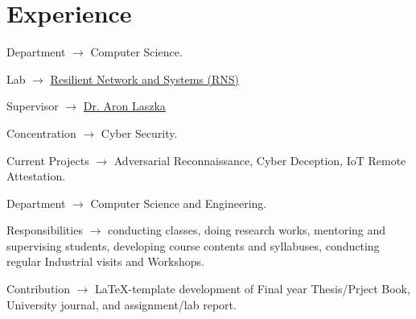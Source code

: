 \documentclass[letterpaper,dvipsnames]{deedy-resume} %
\begin{document}
\begin{minipage}[t]{0.63\textwidth} %


\section{Experience}


\vspace{\topsep} %
\begin{tightitemize}
\item Department $\rightarrow$ Computer Science.
\item Lab $\rightarrow$ \href{http://aronlaszka.com/lab.html}{Resilient Network and Systems (RNS)}
\item Supervisor $\rightarrow$ \href{http://aronlaszka.com/index.html}{Dr. Aron Laszka}
\item Concentration $\rightarrow$ Cyber Security.
\item Current Projects $\rightarrow$ Adversarial Reconnaissance, Cyber Deception, IoT Remote Attestation.
\end{tightitemize}

\sectionspace %



\begin{tightitemize}
\item Department $\rightarrow$ Computer Science and Engineering.
\item Responsibilities $\rightarrow$ conducting classes, doing research works, mentoring and supervising students, developing course contents and syllabuses, conducting regular Industrial visits and Workshops.
\item Contribution $\rightarrow$ \LaTeX-template development of Final year Thesis/Prject Book, University journal, and assignment/lab report.
\end{tightitemize}


\end{minipage}
\end{document}
